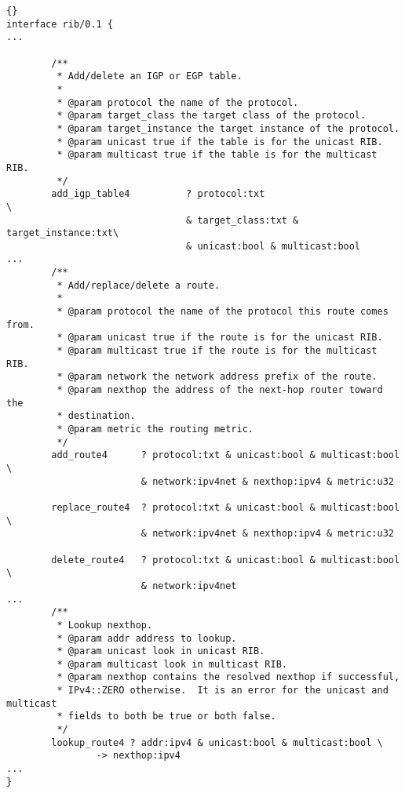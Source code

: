 \documentclass[11pt]{article}
\newcommand{\stt}{\tt\small}
\begin{document}
\newpage
\begin{lstlisting}[caption={Extracts from {\stt xorp/xrl/interfaces/rib.xif} %
                                     \label{lst:rib.xif} } ]{}
interface rib/0.1 {
...

        /**
         * Add/delete an IGP or EGP table.
         *
         * @param protocol the name of the protocol.
         * @param target_class the target class of the protocol.
         * @param target_instance the target instance of the protocol.
         * @param unicast true if the table is for the unicast RIB.
         * @param multicast true if the table is for the multicast RIB.
         */
        add_igp_table4          ? protocol:txt                          \
                                & target_class:txt & target_instance:txt\
                                & unicast:bool & multicast:bool
...
        /**
         * Add/replace/delete a route.
         *
         * @param protocol the name of the protocol this route comes from.
         * @param unicast true if the route is for the unicast RIB.
         * @param multicast true if the route is for the multicast RIB.
         * @param network the network address prefix of the route.
         * @param nexthop the address of the next-hop router toward the
         * destination.
         * @param metric the routing metric.
         */
        add_route4      ? protocol:txt & unicast:bool & multicast:bool  \
                        & network:ipv4net & nexthop:ipv4 & metric:u32

        replace_route4  ? protocol:txt & unicast:bool & multicast:bool  \
                        & network:ipv4net & nexthop:ipv4 & metric:u32

        delete_route4   ? protocol:txt & unicast:bool & multicast:bool  \
                        & network:ipv4net
...
        /**
         * Lookup nexthop.
         * @param addr address to lookup.
         * @param unicast look in unicast RIB.
         * @param multicast look in multicast RIB.
         * @param nexthop contains the resolved nexthop if successful,
         * IPv4::ZERO otherwise.  It is an error for the unicast and multicast
         * fields to both be true or both false.
         */
        lookup_route4 ? addr:ipv4 & unicast:bool & multicast:bool \
                -> nexthop:ipv4
...
}
\end{lstlisting}
\newpage
\end{document}
